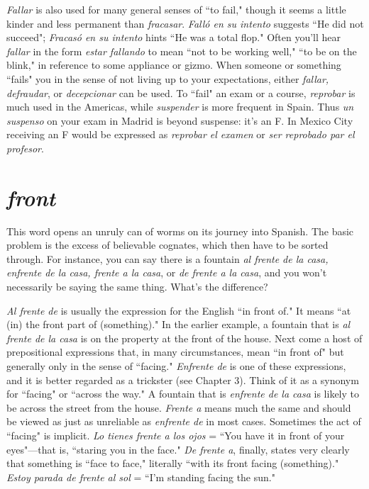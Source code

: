 \emph{Fallar} is also used for many general senses of ``to
fail," though it seems a little kinder and less permanent than \emph{fracasar}.
\emph{Falló en su intento} suggests ``He did not succeed"; \emph{Fracasó en su intento} hints ``He was a total flop." Often you'll hear \emph{fallar} in the form
\emph{estar fallando} to mean ``not to be working well," ``to be on the blink,"
in reference to some appliance or gizmo. When someone or something
``fails" you in the sense of not living up to your expectations, either
\emph{fallar, defraudar}, or \emph{decepcionar} can be used. To ``fail" an exam or a
course, \emph{reprobar} is much used in the Americas, while \emph{suspender} is
more frequent in Spain. Thus \emph{un suspenso} on your exam in Madrid is
beyond suspense: it's an F. In Mexico City receiving an F would be expressed as \emph{reprobar el examen} or \emph{ser reprobado par el profesor}.

\section{\emph{front}}

This word opens an unruly can of worms on its journey into
Spanish. The basic problem is the excess of believable cognates, which
then have to be sorted through. For instance, you can say there is a
fountain \emph{al frente de la casa, enfrente de la casa, frente a la casa}, or
\emph{de frente a la casa}, and you won't necessarily be saying the same
thing. What's the difference?

\emph{Al frente de} is usually the expression for the English ``in front
of." It means ``at (in) the front part of (something)." In the earlier example, a fountain that is \emph{al frente de la casa} is on the property at the
front of the house. Next come a host of prepositional expressions that,
in many circumstances, mean ``in front of" but generally only in the
sense of ``facing." \emph{Enfrente de} is one of these expressions, and it is better regarded as a trickster (see Chapter 3). Think of it as a synonym for
``facing" or ``across the way." A fountain that is \emph{enfrente de la casa} is
likely to be across the street from the house. \emph{Frente a} means much the
same and should be viewed as just as unreliable as \emph{enfrente de} in most
cases. Sometimes the act of ``facing" is implicit. \emph{Lo tienes frente a los
ojos} = ``You have it in front of your eyes"---that is, ``staring you in the
face." \emph{De frente a}, finally, states very clearly that something is ``face
to face," literally ``with its front facing (something)." \emph{Estoy parada de
frente al sol} = ``I'm standing facing the sun."

